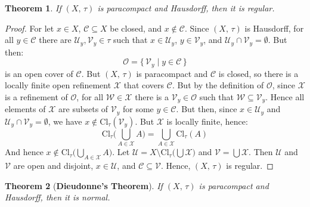 \documentclass{article}
\theoremstyle{plain}
\newtheorem{theorem}{Theorem}[section]
\theoremstyle{normal}
\begin{document}
        \begin{theorem}
            If $(X,\,\tau)$ is paracompact and Hausdorff, then it is regular.
        \end{theorem}
        \begin{proof}
            For let $x\in{X}$, $\mathcal{C}\subseteq{X}$ be closed, and
            $x\notin\mathcal{C}$. Since $(X,\,\tau)$ is Hausdorff, for all
            $y\in\mathcal{C}$ there are $\mathcal{U}_{y},\mathcal{V}_{y}\in\tau$
            such that $x\in\mathcal{U}_{y}$, $y\in\mathcal{V}_{y}$, and
            $\mathcal{U}_{y}\cap\mathcal{V}_{y}=\emptyset$. But then:
            \begin{equation}
                \mathcal{O}=\{\,\mathcal{V}_{y}\;|\;y\in\mathcal{C}\,\}
            \end{equation}
            is an open cover of $\mathcal{C}$. But $(X,\,\tau)$ is paracompact
            and $\mathcal{C}$ is closed, so there is a locally finite open
            refinement $\mathcal{X}$ that covers $\mathcal{C}$. But by the
            definition of $\mathcal{O}$, since $\mathcal{X}$ is a refinement of
            $\mathcal{O}$, for all $\mathcal{W}\in\mathcal{X}$ there is a
            $\mathcal{V}_{y}\in\mathcal{O}$ such that
            $\mathcal{W}\subseteq\mathcal{V}_{y}$. Hence all elements of
            $\mathcal{X}$ are subsets of $\mathcal{V}_{y}$ for some
            $y\in\mathcal{C}$. But then, since $x\in\mathcal{U}_{y}$ and
            $\mathcal{U}_{y}\cap\mathcal{V}_{y}=\emptyset$, we have
            $x\notin\textrm{Cl}_{\tau}(\mathcal{V}_{y})$. But
            $\mathcal{X}$ is locally finite, hence:
            \begin{equation}
                \textrm{Cl}_{\tau}\Big(\bigcup_{A\in\mathcal{X}}A\Big)
                =\bigcup_{A\in\mathcal{X}}\textrm{Cl}_{\tau}(A)
            \end{equation} 
            And hence
            $x\notin\textrm{Cl}_{\tau}\big(\bigcup_{A\in\mathcal{X}}A\big)$.
            Let
            $\mathcal{U}=X\setminus\textrm{Cl}_{\tau}\Big(\bigcup\mathcal{X}\Big)$
            and $\mathcal{V}=\bigcup\mathcal{X}$. Then $\mathcal{U}$ and
            $\mathcal{V}$ are open and disjoint, $x\in\mathcal{U}$, and
            $\mathcal{C}\subseteq\mathcal{V}$. Hence, $(X,\,\tau)$ is regular.
        \end{proof}
        \begin{theorem}[\textbf{Dieudonne's Theorem}]
            If $(X,\,\tau)$ is paracompact and Hausdorff, then it is normal.
        \end{theorem}
\end{document}
